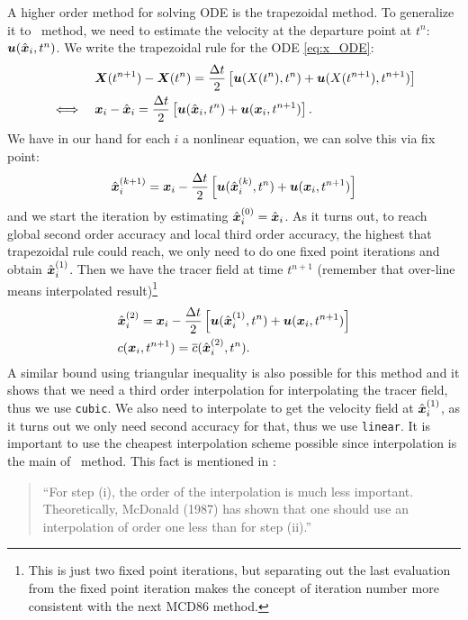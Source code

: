 \documentclass[11pt,letterpaper]{article}
\begin{document}
A higher order method for solving ODE is the trapezoidal method. To generalize it to \sml\ method, we need to estimate the velocity at the departure point at $t^n$: $\boldsymbol{u}(\hat{\boldsymbol{x}}_i,t^n)$. We write the trapezoidal rule for the ODE \eqref{eq:x_ODE}:
\begin{align*}
    &\boldsymbol{X}(t^{n+1})-\boldsymbol{X}(t^{n}) = \frac{\Delta t}{2}\left[\boldsymbol{u}(X(t^{n}),t^n)+\boldsymbol{u}(X(t^{n+1}),t^{n+1})\right]\\
    \iff\quad &\boldsymbol{x}_i-\hat{\boldsymbol{x}}_i = \frac{\Delta t}{2}\left[\boldsymbol{u}(\hat{\boldsymbol{x}}_i,t^n)+\boldsymbol{u}(\boldsymbol{x}_i,t^{n+1})\right].
\end{align*}
We have in our hand for each $i$ a nonlinear equation, we can solve this via fix point:
\begin{align*}
    \hat{\boldsymbol{x}}_i^{(k+1)} = \boldsymbol{x}_i-\frac{\Delta t}{2}\left[\boldsymbol{u}(\hat{\boldsymbol{x}}_i^{(k)},t^n)+\boldsymbol{u}(\boldsymbol{x}_i,t^{n+1})\right]
\end{align*}
and we start the iteration by estimating $\hat{\boldsymbol{x}}_i^{(0)} = \hat{\boldsymbol{x}}_i$. As it turns out, to reach global second order accuracy and local third order accuracy, the highest that trapezoidal rule could reach, we only need to do one fixed point iterations and obtain $\hat{\boldsymbol{x}}_i^{(1)}$. Then we have the tracer field at time $t^{n+1}$ (remember that over-line means interpolated result)\footnote{This is just two fixed point iterations, but separating out the last evaluation from the fixed point iteration makes the concept of iteration number more consistent with the next MCD86 method.}
\begin{align*}
    &\hat{\boldsymbol{x}}_i^{(2)} = \boldsymbol{x}_i-\frac{\Delta t}{2}\left[\boldsymbol{u}(\hat{\boldsymbol{x}}_i^{(1)},t^n)+\boldsymbol{u}(\boldsymbol{x}_i,t^{n+1})\right]\\
    &c({\boldsymbol{x}}_i,t^{n+1}) = \overline{c}(\hat{\boldsymbol{x}}_i^{(2)},t^{n}).
\end{align*}
A similar bound using triangular inequality is also possible for this method and it shows that we need a third order interpolation for interpolating the tracer field, thus we use \texttt{cubic}. We also need to interpolate to get the velocity field at $\hat{\boldsymbol{x}}_i^{(1)}$, as it turns out we only need second accuracy for that, thus we use \texttt{linear}. It is important to use the cheapest interpolation scheme possible since interpolation is the main of \sml\ method. This fact is mentioned in \cite{staniforth1991}: 
\begin{quote}
    ``For step (i), the order of the interpolation is much less important. Theoretically, McDonald (1987) has shown that one should use an interpolation of order one less than for step (ii).''
\end{quote}
\end{document}

